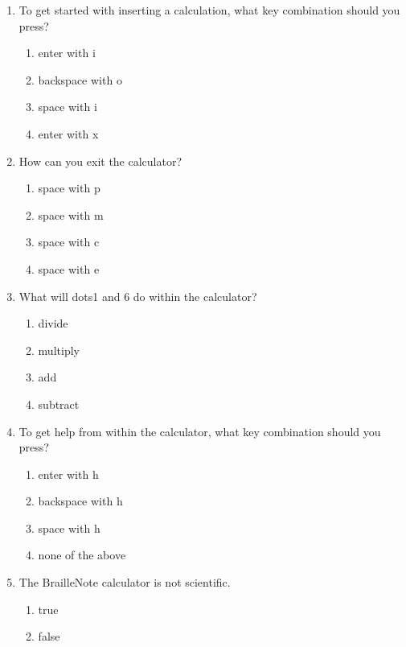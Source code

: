 \documentclass[10pt,letterpaper,twoside]{report}
\begin{document}
{{{\begin{enumerate}
\begin{enumerate}
		      \item the percent key
	      \end{enumerate}
	\item To get started with inserting a calculation, what key combination should you press?
	      \begin{enumerate}
		      \item enter with i
		      \item backspace with o
		      \item space with i
		      \item enter with x
	      \end{enumerate}
	\item How can you exit the calculator?
	      \begin{enumerate}
		      \item space with p
		      \item space with m
		      \item space with c
		      \item space with e
	      \end{enumerate}
	\item What will dots1 and 6 do within the calculator?
	      \begin{enumerate}
		      \item divide
		      \item multiply
		      \item add
		      \item subtract
	      \end{enumerate}
	\item To get help from within the calculator, what key combination should you press?
	      \begin{enumerate}
		      \item enter with h
		      \item backspace with h
		      \item space with h
		      \item none of the above
	      \end{enumerate}
	\item The BrailleNote calculator is not scientific.
	      \begin{enumerate}
		      \item true
		      \item false
	      \end{enumerate}
\end{enumerate}
\clearpage
}}}
\end{document}
